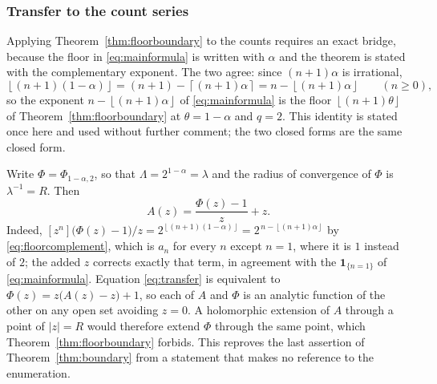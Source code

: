 \documentclass[11pt,letterpaper]{article}
\numberwithin{equation}{section}
\theoremstyle{definition}
\theoremstyle{remark}
\newcommand{\ind}[1]{\boldsymbol{1}_{\{#1\}}}
\newcommand{\floor}[1]{\left\lfloor#1\right\rfloor}
\newcommand{\ceil}[1]{\left\lceil#1\right\rceil}
\begin{document}
\subsubsection*{Transfer to the count series}
Applying Theorem~\ref{thm:floorboundary} to the counts requires an exact
bridge, because the floor in \eqref{eq:mainformula} is written with $\alpha$
and the theorem is stated with the complementary exponent. The two agree:
since $(n+1)\alpha$ is irrational,
\begin{equation}\label{eq:floorcomplement}
 \floor{(n+1)(1-\alpha)}
 =(n+1)-\ceil{(n+1)\alpha}
 =n-\floor{(n+1)\alpha}\qquad(n\ge0),
\end{equation}
so the exponent $n-\floor{(n+1)\alpha}$ of \eqref{eq:mainformula} is the
floor $\floor{(n+1)\theta}$ of Theorem~\ref{thm:floorboundary} at
$\theta=1-\alpha$ and $q=2$. This identity is stated once here and used
without further comment; the two closed forms are the same closed form.

Write $\Phi=\Phi_{1-\alpha,2}$, so that $\Lambda=2^{1-\alpha}=\lambda$ and
the radius of convergence of $\Phi$ is $\lambda^{-1}=R$. Then
\begin{equation}\label{eq:transfer}
 A(z)=\frac{\Phi(z)-1}{z}+z .
\end{equation}
Indeed, $[z^n]\bigl(\Phi(z)-1\bigr)/z=2^{\floor{(n+1)(1-\alpha)}}
=2^{\,n-\floor{(n+1)\alpha}}$ by \eqref{eq:floorcomplement}, which is $a_n$
for every $n$ except $n=1$, where it is $1$ instead of $2$; the added $z$
corrects exactly that term, in agreement with the $\ind{n=1}$ of
\eqref{eq:mainformula}. Equation \eqref{eq:transfer} is equivalent to
$\Phi(z)=z\bigl(A(z)-z\bigr)+1$, so each of $A$ and $\Phi$ is an analytic
function of the other on any open set avoiding $z=0$. A holomorphic
extension of $A$ through a point of $|z|=R$ would therefore extend $\Phi$
through the same point, which Theorem~\ref{thm:floorboundary} forbids.
This reproves the last assertion of Theorem~\ref{thm:boundary} from a
statement that makes no reference to the enumeration.
\end{document}
